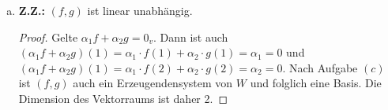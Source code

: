\documentclass{article}
\begin{document}
\begin{enumerate}[(a)]
\begin{align*}
		i &\mapsto -1&&|\exists k\in \N: i = 3\cdot k\\
	\end{align*}
	\textbf{Z.Z.:} $f\in W:$
	\begin{proof}
		$$
		f(n) + f(n+1) + f(n+2) =
		\begin{cases}
			1 + 0 -1 = 0 & \exists k\in \N: n = 3\cdot k-2\\
			0 + -1 + 1 = 0 & \exists k\in\N: n = 3\cdot k - 1\\
			-1 + 1 + 0 = 0 & \exists k\in \N: n = 3\cdot k
		\end{cases}
		$$
	\end{proof}
	\textbf{Z.Z.:} $g\in W:$
	\begin{proof}
		$$
		g(n) + g(n+1) + g(n+2) = 
		\begin{cases}
		0 + 1 + -1 = 0 & \exists k\in \N: n = 3\cdot k-2\\
		1 + -1 + 0 = 0 & \exists k\in\N: n = 3\cdot k - 1\\
		-1 + 0 + 1 = 0 & \exists k\in \N: n = 3\cdot k
		\end{cases}
		$$
	\end{proof}
	\textbf{Z.Z.:} $(f,g)$ ist ein Erzeugendensystem von $W$.
	\begin{proof}
		Sei $h\in W$ beliebig mit $h(1) = \alpha_1$ und $h(2) = \alpha_2$. Behauptung: Dann ist $h = \alpha_1 \cdot f + \alpha_2 \cdot g$.\\
		Beweis der Behauptung: Aus $(\alpha_1 \cdot f + \alpha_2 \cdot g)(1) = \alpha_1\cdot f(1) + \alpha_2 \cdot g(1) = \alpha_1 = h(1)$ und 
		$(\alpha_1 \cdot f + \alpha_2 \cdot g)(2) = \alpha_1\cdot f(2) + \alpha_2 \cdot g(2) = \alpha_2 = h(2)$ folgt mit Teilaufgabe $(b)$ die Behauptung.
	\end{proof}
	\item \textbf{Z.Z.:} $(f,g)$ ist linear unabhängig.
	\begin{proof}
		Gelte $\alpha_1 f + \alpha_2 g = 0_v$.
		Dann ist auch $(\alpha_1 f + \alpha_2 g)(1) = \alpha_1\cdot f(1) + \alpha_2 \cdot g(1) = \alpha_1 = 0$
		und $(\alpha_1 f + \alpha_2 g)(1) = \alpha_1\cdot f(2) + \alpha_2 \cdot g(2) = \alpha_2 = 0$.
		Nach Aufgabe $(c)$ ist $(f,g)$ auch ein Erzeugendensystem von $W$ und folglich eine Basis. Die Dimension des Vektorraums ist daher 2.
	\end{proof}
	\end{enumerate}
\end{document}
